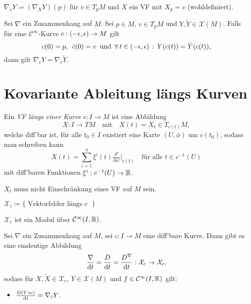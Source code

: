 \documentclass{cheat-sheet}
\newcommand{\coord}[1]{\tfrac{\partial^\phi}{\partial x^{#1}}} %
\newcommand{\vinterval}{\ointerval{-\epsilon}{\epsilon}} %
\newcommand{\Cont}{\mathcal{C}} %
\newcommand{\VF}{\mathcal{X}} %
\begin{document}
\begin{nota}
  $\nabla_v Y \coloneqq (\nabla_X Y)(p)$ für $v \in T_p M$ und $X$ ein VF mit $X_p = v$ (wohldefiniert).
\end{nota}

\begin{samepage}

\begin{satz}
  Sei $\nabla$ ein Zusammenhang auf $M$. Sei $p \in M$, $v \in T_p M$ und $Y, \tilde{Y} \in \VF(M)$. Falls für eine $\Cont^\infty$-Kurve $c : \vinterval \to M$ gilt
  \[
    c(0) = p, \enspace
    \dot{c}(0) = v \enspace \text{und} \enspace
    \fa{t \in \vinterval} Y(c(t)) = \tilde{Y}(c(t)),
  \]
  dann gilt $\nabla_v Y = \nabla_v \tilde{Y}$.
\end{satz}

\section{Kovariante Ableitung längs Kurven}
  
\end{samepage}

\begin{defn}
  Ein \emph{VF längs einer Kurve} $c : I \to M$ ist eine Abbildung
  \[
    X : I \to TM
    \quad \text{mit} \quad
    X(t) = X_t \in T_{c(t)} M,
  \]
  welche diff'bar ist, \dh{} für alle $t_0 \in I$ existiert eine Karte $(U, \phi)$ um $c(t_0)$, sodass man schreiben kann
  \[
    X(t) = \sum_{i=1}^n \xi^i(t) \coord{j}|_{c(t)} \quad \text{für alle } t \in c^{-1}(U)
  \]
  mit diff'baren Funktionen $\xi^i : c^{-1}(U) \to \mathbb{R}$.
\end{defn}

\begin{bem}
  $X_t$ muss nicht Einschränkung eines VF auf $M$ sein.
\end{bem}

\begin{nota}
  $\VF_c \coloneqq \{ \text{ Vektorfelder längs $c$ } \}$
\end{nota}

\begin{bem}
  $\VF_c$ ist ein Modul über $\Cont^\infty(I, \R)$.
\end{bem}

\begin{satz}
  Sei $\nabla$ ein Zusammenhang auf $M$, sei $c : I \to M$ eine diff'bare Kurve. Dann gibt es eine eindeutige Abbildung
  \[ \frac{\nabla}{\d t} = \frac{D}{\d t} = \frac{D^\nabla}{\d t} : \VF_c \to \VF_c, \]
  sodass für $X, \tilde{X} \in \VF_c$, $Y \in \VF(M)$ und $f \in \Cont^\infty(I, \R)$ gilt:
  \begin{itemize}
    \item $\tfrac{D (Y \circ c)}{\mathrm{d} t} = \nabla_{\dot{c}} Y$.
  \end{itemize}
\end{satz}
\end{document}
